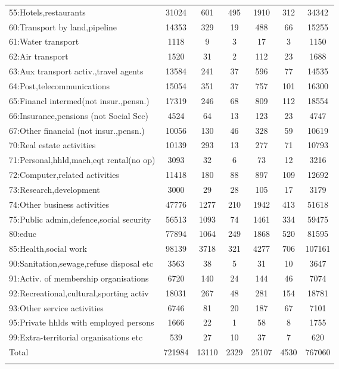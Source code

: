 {\begin{longtable}{l*{6}{c}}
55:Hotels,restaurants&    31024&      601&      495&     1910&      312&    34342\\
60:Transport by land,pipeline&    14353&      329&       19&      488&       66&    15255\\
61:Water transport&     1118&        9&        3&       17&        3&     1150\\
62:Air transport&     1520&       31&        2&      112&       23&     1688\\
63:Aux transport activ.,travel agents&    13584&      241&       37&      596&       77&    14535\\
64:Post,telecommunications&    15054&      351&       37&      757&      101&    16300\\
65:Financl intermed(not insur.,pensn.)&    17319&      246&       68&      809&      112&    18554\\
66:Insurance,pensions (not Social Sec)&     4524&       64&       13&      123&       23&     4747\\
67:Other financial (not insur.,pensn.)&    10056&      130&       46&      328&       59&    10619\\
70:Real estate activities&    10139&      293&       13&      277&       71&    10793\\
71:Personal,hhld,mach,eqt rental(no op)&     3093&       32&        6&       73&       12&     3216\\
72:Computer,related activities&    11418&      180&       88&      897&      109&    12692\\
73:Research,development&     3000&       29&       28&      105&       17&     3179\\
74:Other business activities&    47776&     1277&      210&     1942&      413&    51618\\
75:Public admin,defence,social security&    56513&     1093&       74&     1461&      334&    59475\\
80:educ   &    77894&     1064&      249&     1868&      520&    81595\\
85:Health,social work&    98139&     3718&      321&     4277&      706&   107161\\
90:Sanitation,sewage,refuse disposal etc&     3563&       38&        5&       31&       10&     3647\\
91:Activ. of membership organisations&     6720&      140&       24&      144&       46&     7074\\
92:Recreational,cultural,sporting activ&    18031&      267&       48&      281&      154&    18781\\
93:Other service activities&     6746&       81&       20&      187&       67&     7101\\
95:Private hhlds with employed persons&     1666&       22&        1&       58&        8&     1755\\
99:Extra-territorial organisations etc&      539&       27&       10&       37&        7&      620\\
Total     &   721984&    13110&     2329&    25107&     4530&   767060\\
\hline\hline
\label{tab:2D_industries}
\end{longtable}
}

